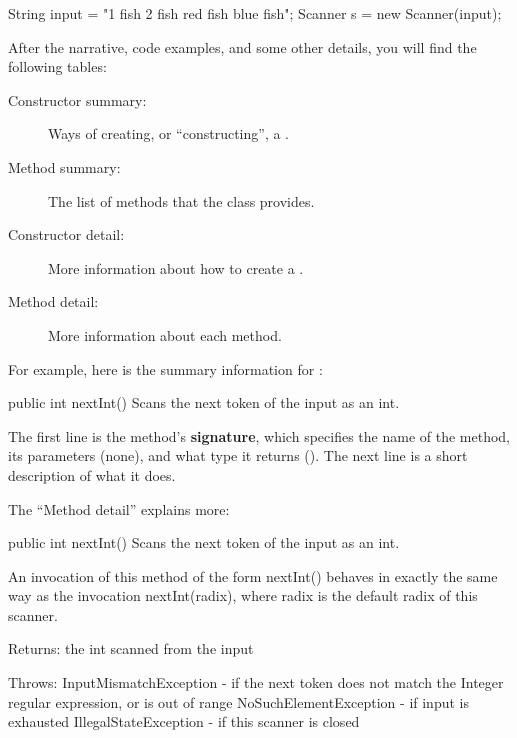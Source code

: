 \begin{code}
String input = "1 fish 2 fish red fish blue fish";
Scanner s = new Scanner(input);
\end{code}

After the narrative, code examples, and some other details, you will find the following tables:

\begin{description}

\item[Constructor summary:]
Ways of creating, or ``constructing'', a .

\item[Method summary:]
The list of methods that the  class provides.

\item[Constructor detail:]
More information about how to create a .

\item[Method detail:]
More information about each method.

\end{description}

For example, here is the summary information for :

\begin{stdout}
public int nextInt()
Scans the next token of the input as an int.
\end{stdout}


The first line is the method's {\bf signature}, which specifies the name of the method, its parameters (none), and what type it returns ().
The next line is a short description of what it does.

The ``Method detail'' explains more:

\begin{stdout}
public int nextInt()
Scans the next token of the input as an int.

An invocation of this method of the form nextInt() behaves in
exactly the same way as the invocation nextInt(radix), where
radix is the default radix of this scanner.

Returns:
the int scanned from the input

Throws:
InputMismatchException - if the next token does not match
    the Integer regular expression, or is out of range
NoSuchElementException - if input is exhausted
IllegalStateException - if this scanner is closed
\end{stdout}

